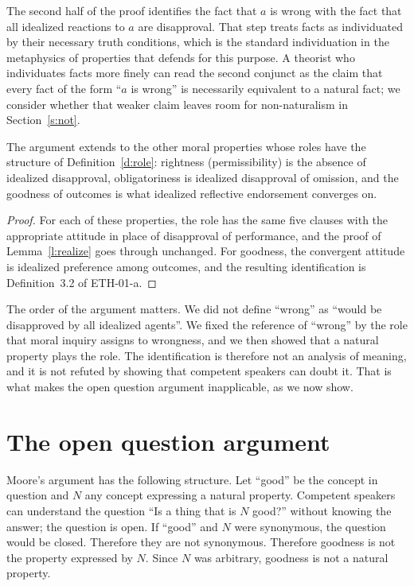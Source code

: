 \documentclass{situationist-preprint}
\begin{document}
The second half of the proof identifies the fact that $a$ is wrong with the fact that all idealized reactions to $a$ are disapproval. That step treats facts as individuated by their necessary truth conditions, which is the standard individuation in the metaphysics of properties that \citet{Jackson1998} defends for this purpose. A theorist who individuates facts more finely can read the second conjunct as the claim that every fact of the form \enquote{$a$ is wrong} is necessarily equivalent to a natural fact; we consider whether that weaker claim leaves room for non-naturalism in Section~\ref{s:not}.

\begin{corollary}\label{c:other}
The argument extends to the other moral properties whose roles have the structure of Definition~\ref{d:role}: rightness (permissibility) is the absence of idealized disapproval, obligatoriness is idealized disapproval of omission, and the goodness of outcomes is what idealized reflective endorsement converges on.
\end{corollary}

\begin{proof}
For each of these properties, the role has the same five clauses with the appropriate attitude in place of disapproval of performance, and the proof of Lemma~\ref{l:realize} goes through unchanged. For goodness, the convergent attitude is idealized preference among outcomes, and the resulting identification is Definition~3.2 of ETH-01-a.
\end{proof}

The order of the argument matters. We did not define \enquote{wrong} as \enquote{would be disapproved by all idealized agents}. We fixed the reference of \enquote{wrong} by the role that moral inquiry assigns to wrongness, and we then showed that a natural property plays the role. The identification is therefore not an analysis of meaning, and it is not refuted by showing that competent speakers can doubt it. That is what makes the open question argument inapplicable, as we now show.

\section{The open question argument}\label{s:oqa}

Moore's argument has the following structure. Let \enquote{good} be the concept in question and $N$ any concept expressing a natural property. Competent speakers can understand the question \enquote{Is a thing that is $N$ good?} without knowing the answer; the question is open. If \enquote{good} and $N$ were synonymous, the question would be closed. Therefore they are not synonymous. Therefore goodness is not the property expressed by $N$. Since $N$ was arbitrary, goodness is not a natural property.
\end{document}
